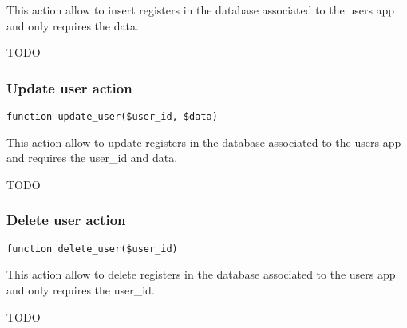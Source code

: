 \documentclass[a4paper]{article}
\begin{document}
This action allow to insert registers in the database associated to
the users app and only requires the data.

TODO

\hypertarget{toc174}{}
\subsubsection{Update user action}

\begin{lstlisting}
function update_user($user_id, $data)
\end{lstlisting}

This action allow to update registers in the database associated to
the users app and requires the user\_id and data.

TODO

\hypertarget{toc175}{}
\subsubsection{Delete user action}

\begin{lstlisting}
function delete_user($user_id)
\end{lstlisting}

This action allow to delete registers in the database associated to
the users app and only requires the user\_id.

TODO

\end{document}
